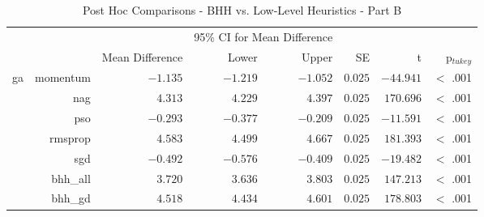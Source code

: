 \begin{table}[H]
	\centering
	\caption{Post Hoc Comparisons - BHH vs. Low-Level Heuristics - Part B}
	\label{tab:results:standalone:post_hoc_part_b}%
	\par\bigskip
	\resizebox{\textwidth}{!}
	{
		\begin{tabular}{lrrrrrrr}
			\toprule
			\multicolumn{1}{c}{} & \multicolumn{1}{c}{} & \multicolumn{1}{c}{} & \multicolumn{2}{c}{95\% CI for Mean Difference} & \multicolumn{1}{c}{} & \multicolumn{1}{c}{} & \multicolumn{1}{c}{}               \\
			\cline{4-5}
			$ $                  & $ $                  & Mean Difference      & Lower                                           & Upper                & SE                   & t                    & p$_{tukey}$ \\
			\cmidrule[0.4pt]{1-8}
			ga                   & momentum             & $-1.135$             & $-1.219$                                        & $-1.052$             & $0.025$              & $-44.941$            & $<$ .001    \\
			$ $                  & nag                  & $4.313$              & $4.229$                                         & $4.397$              & $0.025$              & $170.696$            & $<$ .001    \\
			                     & pso                  & $-0.293$             & $-0.377$                                        & $-0.209$             & $0.025$              & $-11.591$            & $<$ .001    \\
			                     & rmsprop              & $4.583$              & $4.499$                                         & $4.667$              & $0.025$              & $181.393$            & $<$ .001    \\
			                     & sgd                  & $-0.492$             & $-0.576$                                        & $-0.409$             & $0.025$              & $-19.482$            & $<$ .001    \\
			                     & bhh\_all             & $3.720$              & $3.636$                                         & $3.803$              & $0.025$              & $147.213$            & $<$ .001    \\
			                     & bhh\_gd              & $4.518$              & $4.434$                                         & $4.601$              & $0.025$              & $178.803$            & $<$ .001    \\

\end{tabular}}
\end{table}
